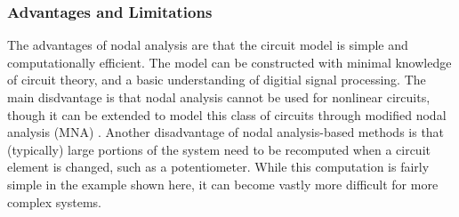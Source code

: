 \documentclass[twoside,a4paper]{article}
\begin{document}
\subsubsection{Advantages and Limitations}
The advantages of nodal analysis are that the circuit model
is simple and computationally efficient. The model can be constructed
with minimal knowledge of circuit theory, and a basic understanding
of digitial signal processing. The main disdvantage is that nodal analysis
cannot be used for nonlinear circuits, though it can be extended
to model this class of circuits through modified nodal analysis (MNA)
\cite{MNA}. Another disadvantage of nodal analysis-based methods
is that (typically) large portions of the system need to be recomputed
when a circuit element is changed, such as a potentiometer. While this
computation is fairly simple in the example shown here, it can become
vastly more difficult for more complex systems.
\end{document}
